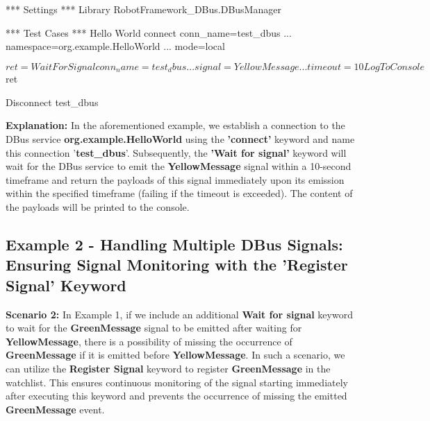 \begin{robotcode}
*** Settings ***
Library    RobotFramework_DBus.DBusManager

*** Test Cases ***
Hello World
   connect    conn_name=test_dbus
   ...        namespace=org.example.HelloWorld
   ...        mode=local

   ${ret}=    Wait For Signal     conn_name=test_dbus
   ...                            signal=YellowMessage
   ...                            timeout=10

   Log To Console    ${ret}

   Disconnect    test_dbus
\end{robotcode}

\textbf{Explanation:}
In the aforementioned example, we establish a connection to the DBus service \textbf{org.example.HelloWorld} using the \textbf{'connect'} keyword and name this connection '\textbf{test\_dbus}'.
Subsequently, the \textbf{'Wait for signal'} keyword will wait for the DBus service to emit the \textbf{YellowMessage} signal within a 10-second timeframe and return the payloads of this signal
immediately upon its emission within the specified timeframe (failing if the timeout is exceeded). The content of the payloads will be printed to the console.

\hypertarget{description-example2}{%
\subsection{\texorpdfstring{\textbf{Example 2 - Handling Multiple DBus Signals: Ensuring Signal Monitoring with the 'Register Signal' Keyword}}{Example 2 - Handling Multiple DBus Signals: Ensuring Signal Monitoring with the 'Register Signal' Keyword}}\label{description-example2}}

\textbf{Scenario 2:}
In Example 1, if we include an additional \textbf{Wait for signal} keyword to wait for the \textbf{GreenMessage} signal to be emitted after waiting for \textbf{YellowMessage},
there is a possibility of missing the occurrence of \textbf{GreenMessage} if it is emitted before \textbf{YellowMessage}. In such a scenario, we can utilize the \textbf{Register Signal}
keyword to register \textbf{GreenMessage} in the watchlist. This ensures continuous monitoring of the signal starting immediately after executing this keyword and prevents the occurrence
of missing the emitted \textbf{GreenMessage} event.


